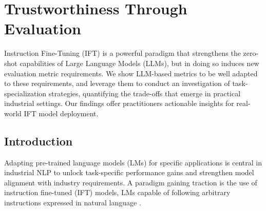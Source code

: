\setchapterpreamble[u]{\margintoc}
\chapter{Trustworthiness Through Evaluation}


\begin{kaobox}[frametitle=Paper Abstract]

Instruction Fine-Tuning (IFT) is a powerful paradigm that strengthens the zero-shot capabilities of Large Language Models (LLMs), but in doing so induces new evaluation metric requirements. We show LLM-based metrics to be well adapted to these requirements, and leverage them to conduct an investigation of task-specialization strategies, quantifying the trade-offs that emerge in practical industrial settings. Our findings offer practitioners actionable insights for real-world IFT model deployment.
\end{kaobox}


\section{Introduction}
\label{sec:introduction}

Adapting pre-trained language models (LMs) for specific applications is central in industrial NLP to unlock task-specific performance gains and strengthen model alignment with industry requirements.  A paradigm gaining traction is the use of instruction fine-tuned (IFT) models, LMs capable of following arbitrary instructions expressed in natural language .

